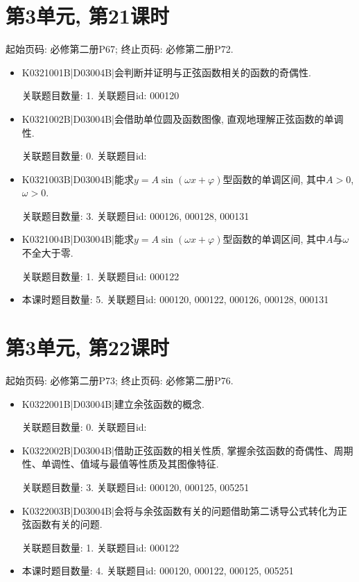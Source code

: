 \section*{第3单元, 第21课时}
起始页码: 必修第二册P67; 终止页码: 必修第二册P72.
\begin{itemize}
\item K0321001B|D03004B|会判断并证明与正弦函数相关的函数的奇偶性.

关联题目数量: 1. 关联题目id: 000120

\item K0321002B|D03004B|会借助单位圆及函数图像, 直观地理解正弦函数的单调性.

关联题目数量: 0. 关联题目id: 

\item K0321003B|D03004B|能求$y=A\sin(\omega x+\varphi)$型函数的单调区间, 其中$A>0$, $\omega>0$.

关联题目数量: 3. 关联题目id: 000126, 000128, 000131

\item K0321004B|D03004B|能求$y=A\sin(\omega x+\varphi)$型函数的单调区间, 其中$A$与$\omega$不全大于零.

关联题目数量: 1. 关联题目id: 000122

\item 本课时题目数量: 5. 关联题目id: 000120, 000122, 000126, 000128, 000131

\end{itemize}

\section*{第3单元, 第22课时}
起始页码: 必修第二册P73; 终止页码: 必修第二册P76.
\begin{itemize}
\item K0322001B|D03004B|建立余弦函数的概念.

关联题目数量: 0. 关联题目id: 

\item K0322002B|D03004B|借助正弦函数的相关性质, 掌握余弦函数的奇偶性、周期性、单调性、值域与最值等性质及其图像特征.

关联题目数量: 3. 关联题目id: 000120, 000125, 005251

\item K0322003B|D03004B|会将与余弦函数有关的问题借助第二诱导公式转化为正弦函数有关的问题.

关联题目数量: 1. 关联题目id: 000122

\item 本课时题目数量: 4. 关联题目id: 000120, 000122, 000125, 005251

\end{itemize}

